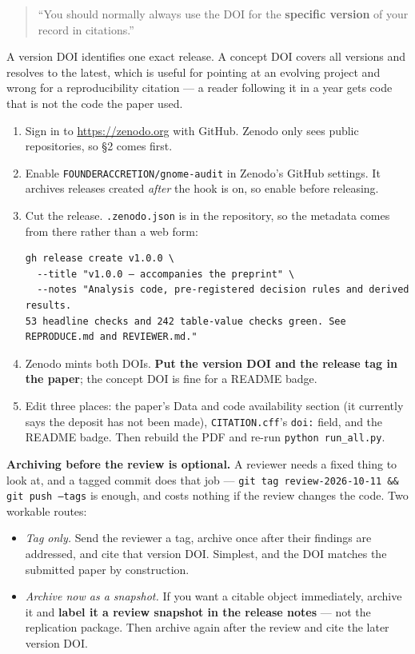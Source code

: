 \documentclass[11pt]{article}
\begin{document}
\begin{quote}
``You should normally always use the DOI for the \textbf{specific version} of your record in
citations.''
\end{quote}

A version DOI identifies one exact release. A concept DOI covers all versions and resolves
to the latest, which is useful for pointing at an evolving project and wrong for a
reproducibility citation --- a reader following it in a year gets code that is not the code
the paper used.

\begin{enumerate}[nosep]
\item Sign in to \url{https://zenodo.org} with GitHub. Zenodo only sees public
      repositories, so \S2 comes first.
\item Enable \texttt{FOUNDERACCRETION/gnome-audit} in Zenodo's GitHub settings. It archives
      releases created \emph{after} the hook is on, so enable before releasing.
\item Cut the release. \texttt{.zenodo.json} is in the repository, so the metadata comes
      from there rather than a web form:
\begin{Verbatim}[fontsize=\small,frame=single]
gh release create v1.0.0 \
  --title "v1.0.0 — accompanies the preprint" \
  --notes "Analysis code, pre-registered decision rules and derived results.
53 headline checks and 242 table-value checks green. See REPRODUCE.md and REVIEWER.md."
\end{Verbatim}
\item Zenodo mints both DOIs. \textbf{Put the version DOI and the release tag in the
      paper}; the concept DOI is fine for a README badge.
\item Edit three places: the paper's Data and code availability section (it currently says
      the deposit has not been made), \texttt{CITATION.cff}'s \texttt{doi:} field, and the
      README badge. Then rebuild the PDF and re-run \texttt{python run\_all.py}.
\end{enumerate}

\textbf{Archiving before the review is optional.} A reviewer needs a fixed thing to look
at, and a tagged commit does that job --- \texttt{git tag review-2026-10-11 \&\& git push
--tags} is enough, and costs nothing if the review changes the code. Two workable routes:

\begin{itemize}[nosep]
\item \emph{Tag only.} Send the reviewer a tag, archive once after their findings are
      addressed, and cite that version DOI. Simplest, and the DOI matches the submitted
      paper by construction.
\item \emph{Archive now as a snapshot.} If you want a citable object immediately, archive it
      and \textbf{label it a review snapshot in the release notes} --- not the replication
      package. Then archive again after the review and cite the later version DOI.
\end{itemize}
\end{document}
